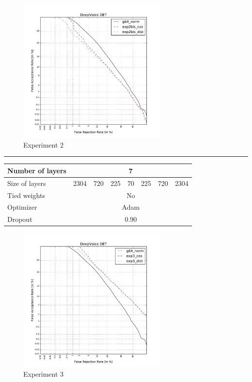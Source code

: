 \documentclass[conference]{IEEEtran}
\begin{document}
\begin{figure}[!h]
    \centering
    \includegraphics[width=7.5cm]{../scores/det2bis.pdf}
    \captionsetup{labelformat=empty}
    \caption{Experiment 2}
\end{figure}

\hrule
\vspace{0.5cm}

\begin{table}[!h]
\centering
\begin{tabular}{|l|c|c|c|c|c|c|c|}
\hline
Number of layers & \multicolumn{7}{c|}{7}                \\ \hline
Size of layers   & 2304 & 720 & 225 & 70 & 225 & 720 & 2304  \\ \hline
Tied weights     & \multicolumn{7}{c|}{No}               \\ \hline
Optimizer        & \multicolumn{7}{c|}{Adam} \\ \hline
Dropout          & \multicolumn{7}{c|}{0.90} \\ \hline
\end{tabular}
\end{table}

\begin{figure}[!h]
    \centering
    \includegraphics[width=7.5cm]{../scores/det3.pdf}
    \captionsetup{labelformat=empty}
    \caption{Experiment 3}
\end{figure}
\end{document}
